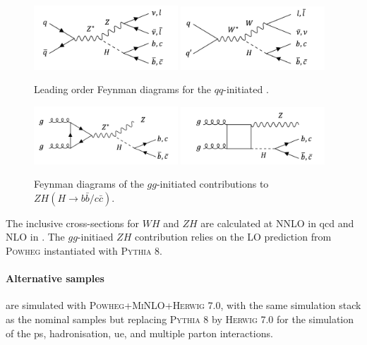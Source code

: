 \begin{figure}[h!]
  \center
  \includegraphics[width=0.48\textwidth]{Images/VH/Feynman/zh.png}
  \includegraphics[width=0.48\textwidth]{Images/VH/Feynman/wh.png}
  \caption{Leading order Feynman diagrams for the $qq$-initiated \vhbc.} 
  \label{fig:feynloVH}
\end{figure}

\begin{figure}[h!]
  \center
  \includegraphics[width=0.48\textwidth]{Images/VH/Feynman/vh2order.png}
  \includegraphics[width=0.48\textwidth]{Images/VH/Feynman/vh3order.png}
  \caption{Feynman diagrams of the $gg$-initiated contributions to $ZH(H\rightarrow b\bar{b}/c\bar{c})$.} 
  \label{fig:feynnloVH}
\end{figure}

The inclusive cross-sections for $WH$ and $ZH$ are calculated at NNLO in \gls{qcd} \cite{BREIN2004149} and NLO in  \cite{PDFLHCrun2}. The $gg$-initiaed $ZH$ contribution relies on the LO prediction from \textsc{Powheg} instantiated with \textsc{Pythia} 8.

\paragraph{Alternative samples} are simulated with \textsc{Powheg}+\textsc{MiNLO}+\textsc{Herwig} 7.0, with the same simulation stack as the nominal samples but replacing \textsc{Pythia} 8 by \textsc{Herwig} 7.0 \cite{bellm2017herwig} for the simulation of the \gls{ps}, hadronisation, \gls{ue}, and multiple parton interactions.

